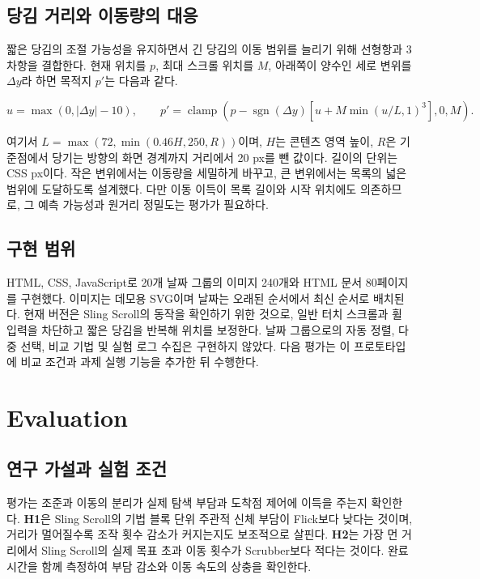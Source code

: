 \documentclass[manuscript,review,nonacm]{acmart}
\begin{document}
\subsection{당김 거리와 이동량의 대응}

짧은 당김의 조절 가능성을 유지하면서 긴 당김의 이동 범위를 늘리기 위해 선형항과 3차항을 결합한다. 현재 위치를 $p$, 최대 스크롤 위치를 $M$, 아래쪽이 양수인 세로 변위를 $\Delta y$라 하면 목적지 $p'$는 다음과 같다.

\[
u=\max(0,|\Delta y|-10),\qquad
p'=\operatorname{clamp}\!\left(p-\operatorname{sgn}(\Delta y)\left[u+M\min(u/L,1)^3\right],0,M\right).
\]

여기서 $L=\max(72,\min(0.46H,250,R))$이며, $H$는 콘텐츠 영역 높이, $R$은 기준점에서 당기는 방향의 화면 경계까지 거리에서 20 px를 뺀 값이다. 길이의 단위는 CSS px이다. 작은 변위에서는 이동량을 세밀하게 바꾸고, 큰 변위에서는 목록의 넓은 범위에 도달하도록 설계했다. 다만 이동 이득이 목록 길이와 시작 위치에도 의존하므로, 그 예측 가능성과 원거리 정밀도는 평가가 필요하다.

\subsection{구현 범위}

HTML, CSS, JavaScript로 20개 날짜 그룹의 이미지 240개와 HTML 문서 80페이지를 구현했다. 이미지는 데모용 SVG이며 날짜는 오래된 순서에서 최신 순서로 배치된다. 현재 버전은 Sling Scroll의 동작을 확인하기 위한 것으로, 일반 터치 스크롤과 휠 입력을 차단하고 짧은 당김을 반복해 위치를 보정한다. 날짜 그룹으로의 자동 정렬, 다중 선택, 비교 기법 및 실험 로그 수집은 구현하지 않았다. 다음 평가는 이 프로토타입에 비교 조건과 과제 실행 기능을 추가한 뒤 수행한다.

\section{Evaluation}

\subsection{연구 가설과 실험 조건}

평가는 조준과 이동의 분리가 실제 탐색 부담과 도착점 제어에 이득을 주는지 확인한다. \textbf{H1}은 Sling Scroll의 기법 블록 단위 주관적 신체 부담이 Flick보다 낮다는 것이며, 거리가 멀어질수록 조작 횟수 감소가 커지는지도 보조적으로 살핀다. \textbf{H2}는 가장 먼 거리에서 Sling Scroll의 실제 목표 초과 이동 횟수가 Scrubber보다 적다는 것이다. 완료 시간을 함께 측정하여 부담 감소와 이동 속도의 상충을 확인한다.
\end{document}
